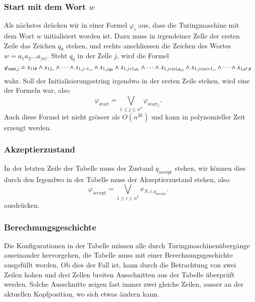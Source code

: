 \subsubsection{Start mit dem Wort $w$}
Als nächstes drücken wir in einer Formel $\varphi_i$ aus,
dass die Turingmaschine mit dem
Wort $w$ initialisiert worden ist. Dazu muss in irgendeiner
Zelle der ersten Zeile das Zeichen $q_0$ stehen, und rechts
anschliessen die Zeichen des Wortes $w=a_1a_2\dots a_{|w|}$.
Steht $q_0$ in der
Zelle $j$, wird die Formel
\[
\varphi_{\text{start},j}
=
x_{11\#}\wedge
x_{12\blank}\wedge \dots \wedge
x_{1,j-1,\blank}\wedge
x_{1,j,q_0}\wedge
x_{1,j+1,a_1}\wedge\dots\wedge
x_{1,j+|w|,a_{|w|}}\wedge
x_{1,j+|w|+1,\blank}\wedge\dots\wedge
x_{1,n^k,\#}
\]
wahr.
Soll der Initialisierungsstring irgendwo in der ersten Zeile
stehen, wird eine der Formeln war, also
\[
\varphi_{\text{start}} = \bigvee_{1\le j\le n^k} \varphi_{\text{start}_j}.
\]
Auch diese Formel ist nicht grösser als $O(n^{2k})$ und kann in
polynomieller Zeit erzeugt werden.

\subsubsection{Akzeptierzustand}
In der letzten Zeile der Tabelle muss der Zustand $q_\text{accept}$ stehen,
wir können dies durch den 
Irgendwo in der Tabelle muss der Akzeptierzustand stehen, also
\[
\varphi_{\text{accept}} 
=
\bigvee_{1\le i\le n^k} x_{N,i,q_{\text{accept}}}.
\]
ausdrücken.

\subsubsection{Berechnungsgeschichte}
Die Konfigurationen in der Tabelle müssen alle durch
Turingmaschinenübergänge auseinander hervorgehen, die Tabelle muss
mit einer Berechnungsgeschichte ausgefüllt werden.
Ob dies der Fall ist, kann durch die Betrachtung von zwei Zeilen
hohen und drei Zellen breiten Ausschnitten aus der Tabelle
überprüft werden.
Solche Ausschnitte zeigen fast immer zwei
gleiche Zeilen, ausser an der aktuellen Kopfposition, wo
sich etwas ändern kann.

